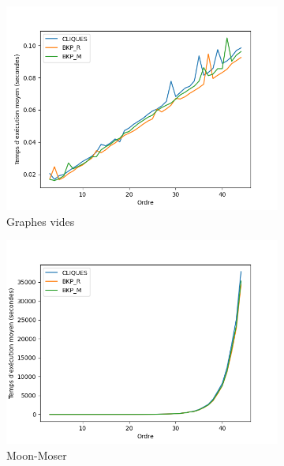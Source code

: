 \documentclass[12pt,a4paper]{article}
\begin{document}
\begin{figure}[ht]
  \centering
  \begin{subfigure}[b]{0.42\textwidth}
    \includegraphics[width=\textwidth]{images/total_pivot_empty_plot.png}
    \caption{Graphes vides}
    \label{subfig:total_empty}
  \end{subfigure}
  \begin{subfigure}[b]{0.42\textwidth}
    \includegraphics[width=\textwidth]{images/total_pivot_turan_plot.png}
    \caption{Moon-Moser}
    \label{subfig:total_turan}
  \end{subfigure}
  \begin{subfigure}[b]{0.42\textwidth}

\end{subfigure}
\end{figure}
\end{document}
